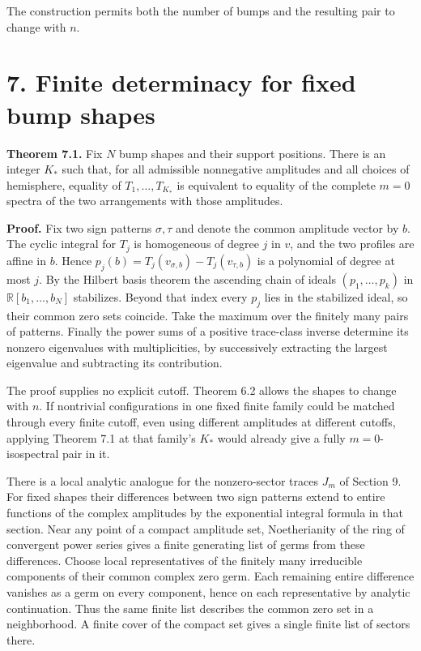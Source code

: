 \documentclass[11pt,letterpaper]{article}
\begin{document}
The construction permits both the number of bumps and the resulting pair to change with
\(n\).

\section{7. Finite determinacy for fixed bump
shapes}\label{finite-determinacy-for-fixed-bump-shapes}

\textbf{Theorem 7.1.} Fix \(N\) bump shapes and their support positions. There is an integer
\(K_*\) such that, for all admissible nonnegative amplitudes and all choices of hemisphere,
equality of \(T_1,\ldots,T_{K_*}\) is equivalent to equality of the complete \(m=0\) spectra
of the two arrangements with those amplitudes.

\textbf{Proof.} Fix two sign patterns \(\sigma,\tau\) and denote the common amplitude vector
by \(b\). The cyclic integral for \(T_j\) is homogeneous of degree \(j\) in \(v\), and the
two profiles are affine in \(b\). Hence \(p_j(b)=T_j(v_{\sigma,b})-T_j(v_{\tau,b})\) is a
polynomial of degree at most \(j\). By the Hilbert basis theorem the ascending chain of
ideals \((p_1,\ldots,p_k)\) in \(\mathbb R[b_1,\ldots,b_N]\) stabilizes. Beyond that index
every \(p_j\) lies in the stabilized ideal, so their common zero sets coincide. Take the
maximum over the finitely many pairs of patterns. Finally the power sums of a positive
trace-class inverse determine its nonzero eigenvalues with multiplicities, by successively
extracting the largest eigenvalue and subtracting its contribution.

The proof supplies no explicit cutoff. Theorem 6.2 allows the shapes to change with \(n\).
If nontrivial configurations in one fixed finite family could be matched through every
finite cutoff, even using different amplitudes at different cutoffs, applying Theorem 7.1 at
that family's \(K_*\) would already give a fully \(m=0\)-isospectral pair in it.

There is a local analytic analogue for the nonzero-sector traces \(J_m\) of Section 9. For
fixed shapes their differences between two sign patterns extend to entire functions of the
complex amplitudes by the exponential integral formula in that section. Near any point of a
compact amplitude set, Noetherianity of the ring of convergent power series gives a finite
generating list of germs from these differences. Choose local representatives of the
finitely many irreducible components of their common complex zero germ. Each remaining
entire difference vanishes as a germ on every component, hence on each representative by
analytic continuation. Thus the same finite list describes the common zero set in a
neighborhood. A finite cover of the compact set gives a single finite list of sectors there.
\end{document}
